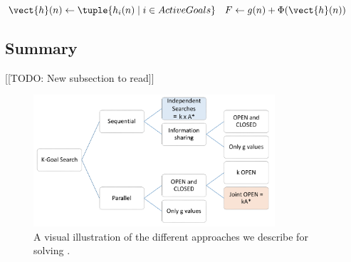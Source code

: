 




$\vect{h}(n)\gets \tuple{ h_i(n) \mid i\in ActiveGoals }$
$F\gets g(n)+\Phi(\vect{h}(n))$







\subsection{Summary}
[[TODO: New subsection to read]]
\begin{figure}
\centering
\includegraphics[width=0.8\textwidth]{k-goal-approaches}
\caption{A visual illustration of the different approaches we describe for solving \kgs.}
\label{fig:approaches}
\end{figure}

